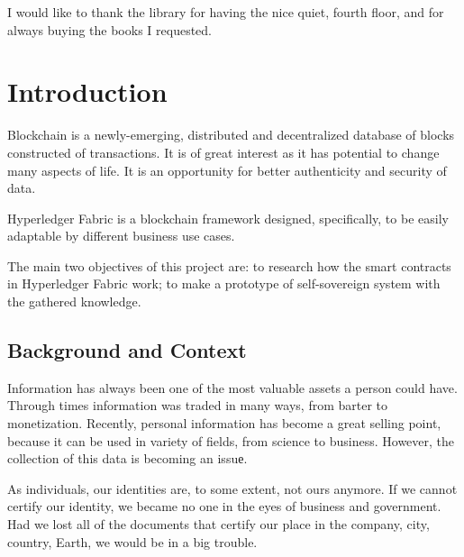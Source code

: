 \documentclass[a4paper,11pt]{report}
\begin{document}
I would like to thank the library for having the nice quiet, fourth floor, and for always buying the books I requested. 


\tableofcontents

\listoffigures                


\clearpage


\setcounter{page}{1}



\chapter{Introduction}

\label{introduction}

Blockchain is a newly-emerging, distributed and decentralized database of blocks constructed of transactions. It is of great interest as it has potential to change many aspects of life. It is an opportunity for better authenticity and security of data. 

Hyperledger Fabric is a blockchain framework designed, specifically, to be easily adaptable by different business use cases. 

The main two objectives of this project are: to research how the smart contracts in Hyperledger Fabric work; to make a prototype of self-sovereign system with the gathered knowledge. 

\section{Background and Context}

\label{introduction-background}

Information has always been one of the most valuable assets a person could have. Through times information was traded in many ways, from barter to monetization. Recently, personal information has become a great selling point, because it can be used in variety of fields, from science to business. However, the collection of this data is becoming an issuе.

	As individuals, our identities are, to some extent, not ours anymore. If we cannot certify our identity, we became no one in the eyes of business and government. Had we lost all of the documents that certify our place in the company, city, country, Earth, we would be in a big trouble. \cite{allen2016path}
	
\end{document}

